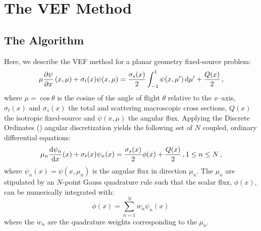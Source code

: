 
\newcommand{\rell}{^\ell} %
\newcommand{\relll}{^{\ell+1}} %
\newcommand{\rellh}{^{\ell+1/2}} %

\newcommand{\paren}[1]{\left(#1\right)} 

\section{The VEF Method}
\subsection{The Algorithm}
Here, we describe the VEF method for a planar geometry fixed-source problem:
	\begin{equation} 
		\mu \pderiv{\psi}{x} \paren{x, \mu} + \sigma_t(x) \psi(x,\mu) = 
			\frac{\sigma_s(x)}{2} \int_{-1}^1 \psi(x,\mu') \ud \mu' + \frac{Q(x)}{2} \,,
	\end{equation}
where $\mu = \cos\theta$ is the cosine of the angle of flight $\theta$ relative to the $x$--axis, $\sigma_t(x)$ and $\sigma_s(x)$ the total and scattering macroscopic cross sections, $Q(x)$ the isotropic fixed-source and $\psi(x, \mu)$ the angular flux. Applying the Discrete Ordinates (\SN) angular discretization yields the following set of $N$ coupled, ordinary differential equations: 
	\begin{equation} \label{eq:sn}
		\mu_n \frac{\mathop{}\!\mathrm{d} \psi_n}{\mathop{}\!\mathrm{d} x}(x) + \sigma_t(x) \psi_n(x) = 
		\frac{\sigma_s(x)}{2} \phi(x) + \frac{Q(x)}{2} \,, 1 \leq n \leq N \,,
	\end{equation}
where $\psi_n(x) = \psi(x, \mu_n)$ is the angular flux in direction $\mu_n$. The $\mu_n$ are stipulated by an $N$-point Gauss quadrature rule such that the scalar flux, $\phi(x)$, can be numerically integrated with: 
	\begin{equation} \label{eq:phiquad}
		\phi(x) = \sum_{n=1}^N w_n \psi_n(x) \,
	\end{equation}
where the $w_n$ are the quadrature weights corresponding to the $\mu_n$. 

